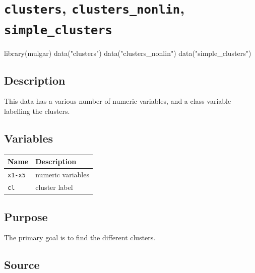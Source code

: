 \documentclass[
  letterpaper,
]{krantz}
\newenvironment{Shaded}{\begin{snugshade}}{\end{snugshade}}
\newcommand{\FunctionTok}[1]{\textcolor[rgb]{0.28,0.35,0.67}{#1}}
\newcommand{\NormalTok}[1]{\textcolor[rgb]{0.00,0.23,0.31}{#1}}
\newcommand{\StringTok}[1]{\textcolor[rgb]{0.13,0.47,0.30}{#1}}
\begin{document}
\section{\texorpdfstring{\texttt{clusters}, \texttt{clusters\_nonlin},
\texttt{simple\_clusters}}{clusters, clusters\_nonlin, simple\_clusters}}\label{clusters-clusters_nonlin-simple_clusters}

\begin{Shaded}
\begin{Highlighting}[]
\FunctionTok{library}\NormalTok{(mulgar)}
\FunctionTok{data}\NormalTok{(}\StringTok{"clusters"}\NormalTok{)}
\FunctionTok{data}\NormalTok{(}\StringTok{"clusters\_nonlin"}\NormalTok{)}
\FunctionTok{data}\NormalTok{(}\StringTok{"simple\_clusters"}\NormalTok{)}
\end{Highlighting}
\end{Shaded}

\subsection*{Description}\label{description-7}

This data has a various number of numeric variables, and a class
variable labelling the clusters.

\subsection*{Variables}\label{variables-7}

\begin{longtable}[]{@{}ll@{}}
\toprule\noalign{}
Name & Description \\
\midrule\noalign{}
\endhead
\bottomrule\noalign{}
\endlastfoot
\texttt{x1-x5} & numeric variables \\
\texttt{cl} & cluster label \\
\end{longtable}

\subsection*{Purpose}\label{purpose-7}

The primary goal is to find the different clusters.

\subsection*{Source}\label{source-7}
\end{document}
